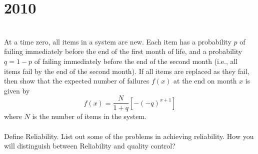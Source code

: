 \section*{2010}
\vspace{-.5cm}
\hrulefill \smallskip\\
 At a time zero, all items in a system are new. Each item has a probability $p$ of failing immediately before the end of the first month of life, and a probability $q=1-p$ of failing immediately before the end of the second month (i.e., all items fail by the end of the second month). If all items are replaced as they fail, then show that the expected number of failures $f(x)$ at the end on month $x$ is given by
\[f(x) = \frac{N}{1+q}\left[-(-q)^{x+1}\right]\]
where $N$ is the number of items in the system.
\\\\
 Define Reliability. List out some of the problems in achieving reliability. How you will distinguish between Reliability and quality control?